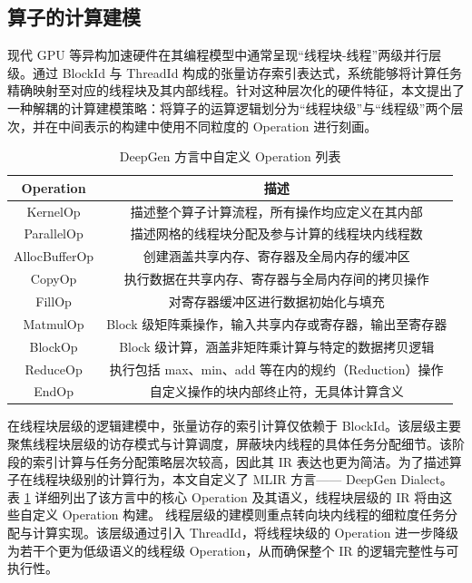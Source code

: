\subsection{算子的计算建模}
现代 GPU 等异构加速硬件在其编程模型中通常呈现“线程块-线程”两级并行层级。通过 BlockId 与 ThreadId 构成的张量访存索引表达式，系统能够将计算任务精确映射至对应的线程块及其内部线程。针对这种层次化的硬件特征，本文提出了一种解耦的计算建模策略：将算子的运算逻辑划分为“线程块级”与“线程级”两个层次，并在中间表示的构建中使用不同粒度的 Operation 进行刻画。

\begin{table}[htbp]
\caption{DeepGen 方言中自定义 Operation 列表}\label{tab:table2}
\vspace{0.5em}\centering\wuhao
\renewcommand{\arraystretch}{1.35}
\begin{tabular}{cc}
\toprule[1.5pt]
Operation & 描述 \\ \midrule[1pt]
KernelOp & 描述整个算子计算流程，所有操作均应定义在其内部 \\
ParallelOp & 描述网格的线程块分配及参与计算的线程块内线程数 \\
AllocBufferOp & 创建涵盖共享内存、寄存器及全局内存的缓冲区 \\
CopyOp & 执行数据在共享内存、寄存器与全局内存间的拷贝操作 \\
FillOp & 对寄存器缓冲区进行数据初始化与填充 \\
MatmulOp & Block 级矩阵乘操作，输入共享内存或寄存器，输出至寄存器 \\
BlockOp & Block 级计算，涵盖非矩阵乘计算与特定的数据拷贝逻辑 \\
ReduceOp & 执行包括 max、min、add 等在内的规约（Reduction）操作 \\
EndOp & 自定义操作的块内部终止符，无具体计算含义 \\ \bottomrule[1.5pt]
\end{tabular}
\vspace{\baselineskip}
\end{table}

在线程块层级的逻辑建模中，张量访存的索引计算仅依赖于 BlockId。该层级主要聚焦线程块层级的访存模式与计算调度，屏蔽块内线程的具体任务分配细节。该阶段的索引计算与任务分配策略层次较高，因此其 IR 表达也更为简洁。为了描述算子在线程块级别的计算行为，本文自定义了 MLIR 方言—— DeepGen Dialect。表 \ref{tab:table2} 详细列出了该方言中的核心 Operation 及其语义，线程块层级的 IR 将由这些自定义 Operation 构建。
线程层级的建模则重点转向块内线程的细粒度任务分配与计算实现。该层级通过引入 ThreadId，将线程块级的 Operation 进一步降级为若干个更为低级语义的线程级 Operation，从而确保整个 IR 的逻辑完整性与可执行性。

